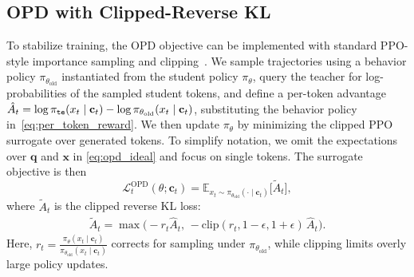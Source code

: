 \subsection{OPD with Clipped-Reverse KL} \label{sec:opd_witch_crkl}
To stabilize training, the OPD objective can be implemented with standard PPO-style importance sampling and clipping~\cite{schulman2017proximal}. 
We sample trajectories using a behavior policy $\pi_{\theta_{\text{old}}}$ instantiated from the student policy $\pi_\theta$,
query the teacher for log-probabilities of the sampled student tokens, and
define a per-token advantage $\hat{A}_t=
\log \pi_{\tt{te}}(x_t \mid \mathbf{c}_t)
-
\log \pi_{\theta_{\text{old}}}(x_t \mid \mathbf{c}_t)$, substituting the behavior policy %
in~\eqref{eq:per_token_reward}.
We then update $\pi_\theta$ by minimizing the clipped PPO surrogate over
generated tokens. To simplify notation, we omit  the expectations over $\mathbf{q}$ and $\mathbf{x}$ in \eqref{eq:opd_ideal} and focus on single tokens. The surrogate objective is then 
\begin{equation}
\label{eq:opd}
\mathcal{L}_t^{\text{OPD}}(\theta; \mathbf{c}_t)
=
\mathbb{E}_{x_t\sim\pi_{\theta_{\textrm{old}}}(\cdot\mid\mathbf{c}_t)}
\Big[
\widetilde{A}_t
\Big],
\end{equation}
where $\widetilde{A}_t$ %
is the clipped reverse KL loss:
\begin{equation}
\label{eq:clipped}
\begin{aligned}
\widetilde{A}_t%
= \max \big(
 - r_t \hat{A}_t,\, %
 - \mathrm{clip}(r_t, 1-\epsilon, 1+\epsilon)\, \hat{A}_t
\big).
\end{aligned}
\end{equation}
%
Here, $r_t = \frac{\pi_\theta(x_t \mid \mathbf{c}_t)}
     {\pi_{\theta_{\text{old}}}(x_t \mid \mathbf{c}_t)}$ corrects for sampling under $\pi_{\theta_{\text{old}}}$, while
clipping limits overly large policy updates. %
